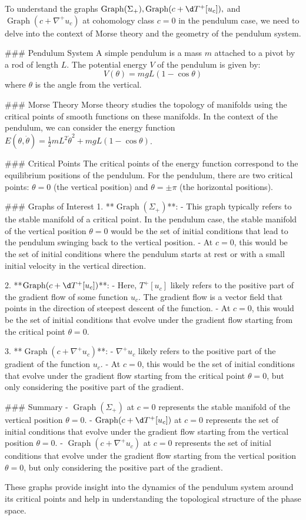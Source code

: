 To understand the graphs \(\operatorname{Graph}(\Sigma_+), \operatorname{Graph}(c + \d T^+[u_c]),\) and \(\operatorname{Graph}(c + \nabla^+ u_c)\) at cohomology class \(c = 0\) in the pendulum case, we need to delve into the context of Morse theory and the geometry of the pendulum system.

### Pendulum System
A simple pendulum is a mass \(m\) attached to a pivot by a rod of length \(L\). The potential energy \(V\) of the pendulum is given by:
\[ V(\theta) = mgL(1 - \cos \theta) \]
where \(\theta\) is the angle from the vertical.

### Morse Theory
Morse theory studies the topology of manifolds using the critical points of smooth functions on these manifolds. In the context of the pendulum, we can consider the energy function \(E(\theta, \dot{\theta}) = \frac{1}{2} m L^2 \dot{\theta}^2 + mgL(1 - \cos \theta)\).

### Critical Points
The critical points of the energy function correspond to the equilibrium positions of the pendulum. For the pendulum, there are two critical points: \(\theta = 0\) (the vertical position) and \(\theta = \pm \pi\) (the horizontal positions).

### Graphs of Interest
1. **\(\operatorname{Graph}(\Sigma_+)\)**:
   - This graph typically refers to the stable manifold of a critical point. In the pendulum case, the stable manifold of the vertical position \(\theta = 0\) would be the set of initial conditions that lead to the pendulum swinging back to the vertical position.
   - At \(c = 0\), this would be the set of initial conditions where the pendulum starts at rest or with a small initial velocity in the vertical direction.

2. **\(\operatorname{Graph}(c + \d T^+[u_c])\)**:
   - Here, \(T^+[u_c]\) likely refers to the positive part of the gradient flow of some function \(u_c\). The gradient flow is a vector field that points in the direction of steepest descent of the function.
   - At \(c = 0\), this would be the set of initial conditions that evolve under the gradient flow starting from the critical point \(\theta = 0\).

3. **\(\operatorname{Graph}(c + \nabla^+ u_c)\)**:
   - \(\nabla^+ u_c\) likely refers to the positive part of the gradient of the function \(u_c\).
   - At \(c = 0\), this would be the set of initial conditions that evolve under the gradient flow starting from the critical point \(\theta = 0\), but only considering the positive part of the gradient.

### Summary
- \(\operatorname{Graph}(\Sigma_+)\) at \(c = 0\) represents the stable manifold of the vertical position \(\theta = 0\).
- \(\operatorname{Graph}(c + \d T^+[u_c])\) at \(c = 0\) represents the set of initial conditions that evolve under the gradient flow starting from the vertical position \(\theta = 0\).
- \(\operatorname{Graph}(c + \nabla^+ u_c)\) at \(c = 0\) represents the set of initial conditions that evolve under the gradient flow starting from the vertical position \(\theta = 0\), but only considering the positive part of the gradient.

These graphs provide insight into the dynamics of the pendulum system around its critical points and help in understanding the topological structure of the phase space.